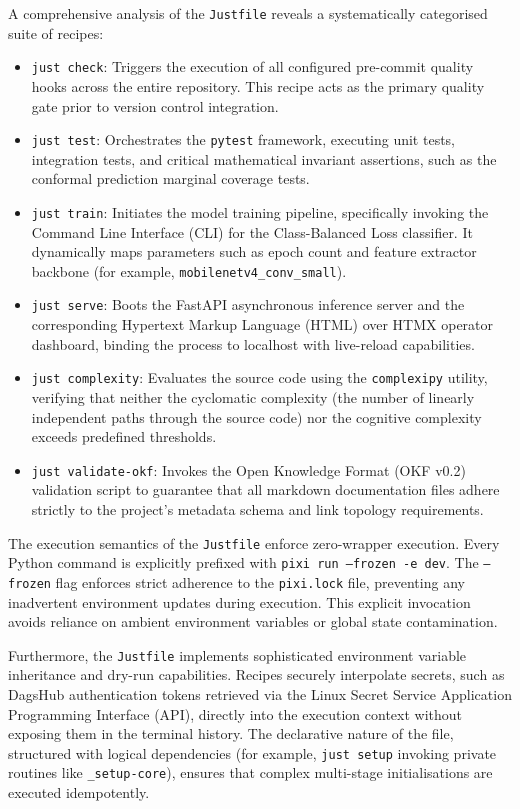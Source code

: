 A comprehensive analysis of the \texttt{Justfile} reveals a systematically categorised suite of recipes:
\begin{itemize}
    \item \texttt{just check}: Triggers the execution of all configured pre-commit quality hooks across the entire repository. This recipe acts as the primary quality gate prior to version control integration.
    \item \texttt{just test}: Orchestrates the \texttt{pytest} framework, executing unit tests, integration tests, and critical mathematical invariant assertions, such as the conformal prediction marginal coverage tests.
    \item \texttt{just train}: Initiates the model training pipeline, specifically invoking the Command Line Interface (CLI) for the Class-Balanced Loss classifier. It dynamically maps parameters such as epoch count and feature extractor backbone (for example, \texttt{mobilenetv4\_conv\_small}).
    \item \texttt{just serve}: Boots the FastAPI asynchronous inference server and the corresponding Hypertext Markup Language (HTML) over HTMX operator dashboard, binding the process to localhost with live-reload capabilities.
    \item \texttt{just complexity}: Evaluates the source code using the \texttt{complexipy} utility, verifying that neither the cyclomatic complexity (the number of linearly independent paths through the source code) nor the cognitive complexity exceeds predefined thresholds.
    \item \texttt{just validate-okf}: Invokes the Open Knowledge Format (OKF v0.2) validation script to guarantee that all markdown documentation files adhere strictly to the project's metadata schema and link topology requirements.
\end{itemize}

The execution semantics of the \texttt{Justfile} enforce zero-wrapper execution. Every Python command is explicitly prefixed with \texttt{pixi run --frozen -e dev}. The \texttt{--frozen} flag enforces strict adherence to the \texttt{pixi.lock} file, preventing any inadvertent environment updates during execution. This explicit invocation avoids reliance on ambient environment variables or global state contamination.

Furthermore, the \texttt{Justfile} implements sophisticated environment variable inheritance and dry-run capabilities. Recipes securely interpolate secrets, such as DagsHub authentication tokens retrieved via the Linux Secret Service Application Programming Interface (API), directly into the execution context without exposing them in the terminal history. The declarative nature of the file, structured with logical dependencies (for example, \texttt{just setup} invoking private routines like \texttt{\_setup-core}), ensures that complex multi-stage initialisations are executed idempotently.

